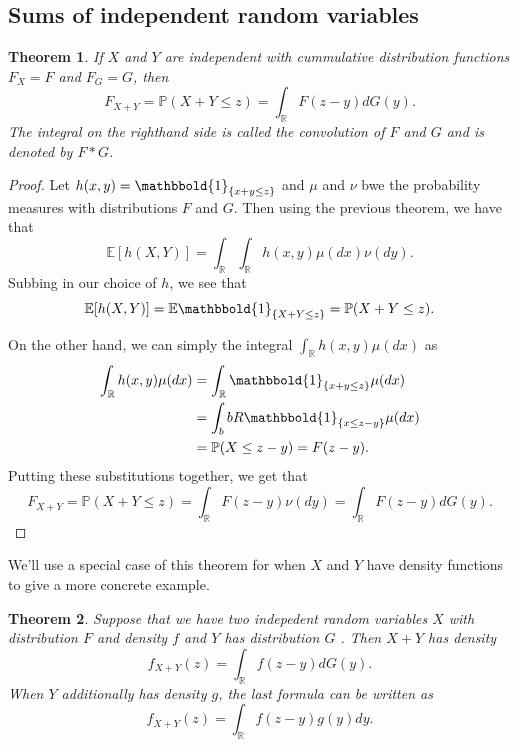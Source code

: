 \documentclass[12pt]{article}
\newcommand{\bbR}{\mathbb{R}}
\newcommand{\Prob}{\mathbb{P}}
\newcommand{\Expect}{\mathbb{E}}
\newcommand{\ind}{\mathbbold{1}}
\newtheorem{thm}{Theorem}[section]
\theoremstyle{definition}
\theoremstyle{remark}
\numberwithin{equation}{section}
\begin{document}
\subsection{Sums of independent random variables}%
\label{sub:sums_of_independent_random_variables}

\begin{thm}
  If $X$ and $Y$ are independent with cummulative distribution functions $F_X = F$ and $F_G = G$, then
  \begin{equation}
    F_{X+Y} = \Prob(X + Y \leq z) = \int_\bbR F(z-y)dG(y).
  \end{equation}
  The integral on the righthand side is called the \emph{convolution of $F$ and $G$} and is denoted by $F*G$.
\end{thm}
\begin{proof}
  Let $h(x,y) = \ind_{ \{x+y\leq z\} }$ and $\mu$ and $\nu$ bwe the probability measures with distributions $F$ and $G$. Then using the previous theorem, we have that
\begin{equation}
    \Expect[ h(X,Y) ] = \int_{\bbR}\int_{\bbR} h(x,y)\mu(dx)\nu(dy).
\end{equation}
Subbing in our choice of $h$, we see that
\begin{equation}
  \Expect[ h(X,Y) ] = \Expect \ind_{ \{X+Y \leq z\} } = \Prob(X + Y \leq z).
\end{equation}

On the other hand, we can simply the integral $\int_\bbR h(x,y) \mu(dx)$ as 
\begin{align}
  \int_\bbR h(x,y) \mu(dx) &= \int_\bbR \ind_{\{x+y \leq z \}} \mu(dx)\\
                           &= \int_bbR \ind_{\{x\leq z-y\}} \mu(dx)\\
                           &= \Prob(X \leq z-y) = F(z-y).
\end{align}
Putting these substitutions together, we get that
\begin{equation} 
  F_{X+Y} = \Prob(X + Y \leq z) = \int_\bbR F(z-y)\nu(dy) = \int_\bbR F(z-y)dG(y).
\end{equation}
\end{proof}

We'll use a special case of this theorem for when $X$ and $Y$ have density functions to give a more concrete example.
\begin{thm}
Suppose that we have two indepedent random variables $X$ with distribution $F$ and density $f$ and $Y$ has distribution $G$ . Then $X+Y$ has density
\begin{equation}
  f_{X+Y}(z)= \int_\bbR f(z-y)dG(y).
\end{equation}
When $Y$ additionally has density $g$, the last formula can be written as 
\begin{equation}
  f_{X+Y}(z)= \int_\bbR f(z-y)g(y)dy. 
\end{equation}
\end{thm}
\end{document}
